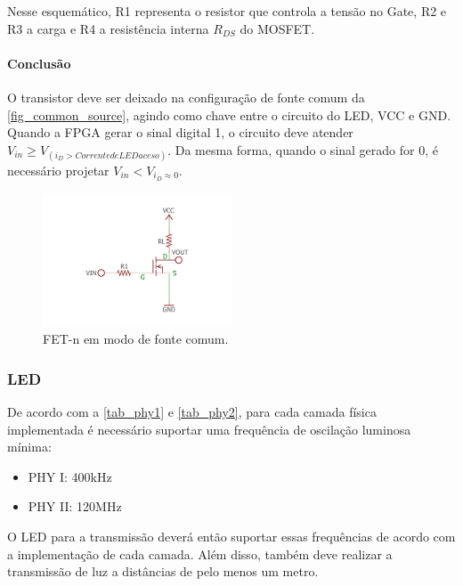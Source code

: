 	Nesse esquemático, R1 representa o resistor que controla a tensão no Gate, R2 e R3 a carga e R4 a resistência interna $R_{DS}$ do MOSFET.
	
	\paragraph{Conclusão}
	
	O transistor deve ser deixado na configuração de fonte comum da \autoref{fig_common_source}, agindo como chave entre o circuito do LED, VCC e GND. Quando a FPGA gerar o sinal digital 1, o circuito deve atender $V_{in} \geq V_{(i_{D} > Corrente de LED aceso)}$. Da mesma forma, quando o sinal gerado for 0, é necessário projetar $V_{in} < V_{i_{D} \approx 0}$.
	
	\begin{figure}[htb]
		\caption{\label{fig_common_source} FET-n em modo de fonte comum.}
		\centering
		\includegraphics[width=0.5\textwidth, trim={0cm 2cm 0cm 2cm}, clip]{circuits/mosfet_example.pdf}
	\end{figure}
	
	\subsubsection{LED}\label{method-hardware-led}

	De acordo com a \autoref{tab_phy1} e \autoref{tab_phy2}, para cada camada física implementada é necessário suportar uma frequência de oscilação luminosa mínima:
	
	\begin{itemize}
		\item PHY I: 400kHz
		\item PHY II: 120MHz
	\end{itemize} 
	
	O LED para a transmissão deverá então suportar essas frequências de acordo com a implementação de cada camada. Além disso, também deve realizar a transmissão de luz a distâncias de pelo menos um metro.
	
